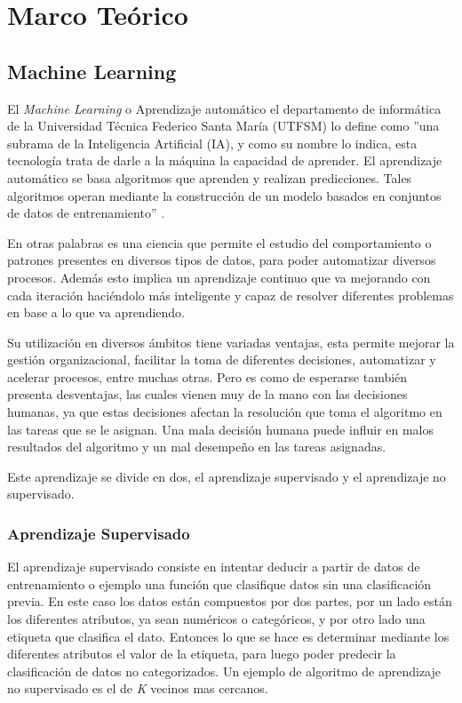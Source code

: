\chapter{Marco Teórico}

\section{Machine Learning}

El \textit{Machine Learning} o Aprendizaje automático el departamento de informática de la Universidad Técnica Federico Santa María (UTFSM) lo define como ''una subrama de la Inteligencia Artificial (IA), y como su nombre lo indica, esta tecnología trata de darle a la máquina la capacidad de aprender. El aprendizaje automático se basa algoritmos que aprenden y realizan predicciones. Tales algoritmos operan mediante la construcción de un modelo basados en conjuntos de datos de entrenamiento'' \cite{machinelearningUTFSM}.

En otras palabras es una ciencia que permite el estudio del comportamiento o patrones presentes en diversos tipos de datos, para poder automatizar diversos procesos. Además esto implica un aprendizaje continuo que va mejorando con cada iteración haciéndolo más inteligente y capaz de resolver diferentes problemas en base a lo que va aprendiendo.

Su utilización en diversos ámbitos tiene variadas ventajas, esta permite mejorar la gestión organizacional, facilitar la toma de diferentes decisiones, automatizar y acelerar procesos, entre muchas otras. Pero es como de esperarse también presenta desventajas, las cuales vienen muy de la mano con las decisiones humanas, ya que estas decisiones afectan la resolución que toma el algoritmo en las tareas que se le asignan. Una mala decisión humana puede influir en malos resultados del algoritmo y un mal desempeño en las tareas asignadas.

Este aprendizaje se divide en dos, el aprendizaje supervisado y el aprendizaje no supervisado.

\subsection{Aprendizaje Supervisado}

El aprendizaje supervisado consiste en intentar deducir a partir de datos de entrenamiento o ejemplo una función que clasifique datos sin una clasificación previa. En este caso los datos están compuestos por dos partes, por un lado están los diferentes atributos, ya sean numéricos o categóricos, y por otro lado una etiqueta que clasifica el dato. Entonces lo que se hace es determinar mediante los diferentes atributos el valor de la etiqueta, para luego poder predecir la clasificación de datos no categorizados. Un ejemplo de algoritmo de aprendizaje no supervisado es el de \textit{K} vecinos mas cercanos.


